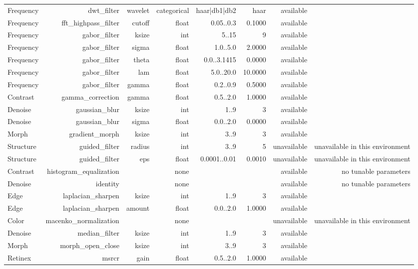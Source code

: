 \begin{tabular}{lrrrrrrr}
Frequency & dwt\_filter & wavelet & categorical & haar|db1|db2 & haar & available &  \\
Frequency & fft\_highpass\_filter & cutoff & float & 0.05..0.3 & 0.1000 & available &  \\
Frequency & gabor\_filter & ksize & int & 5..15 & 9 & available &  \\
Frequency & gabor\_filter & sigma & float & 1.0..5.0 & 2.0000 & available &  \\
Frequency & gabor\_filter & theta & float & 0.0..3.1415 & 0.0000 & available &  \\
Frequency & gabor\_filter & lam & float & 5.0..20.0 & 10.0000 & available &  \\
Frequency & gabor\_filter & gamma & float & 0.2..0.9 & 0.5000 & available &  \\
Contrast & gamma\_correction & gamma & float & 0.5..2.0 & 1.0000 & available &  \\
Denoise & gaussian\_blur & ksize & int & 1..9 & 3 & available &  \\
Denoise & gaussian\_blur & sigma & float & 0.0..2.0 & 0.0000 & available &  \\
Morph & gradient\_morph & ksize & int & 3..9 & 3 & available &  \\
Structure & guided\_filter & radius & int & 3..9 & 5 & unavailable & unavailable in this environment \\
Structure & guided\_filter & eps & float & 0.0001..0.01 & 0.0010 & unavailable & unavailable in this environment \\
Contrast & histogram\_equalization &  & none &  &  & available & no tunable parameters \\
Denoise & identity &  & none &  &  & available & no tunable parameters \\
Edge & laplacian\_sharpen & ksize & int & 1..9 & 3 & available &  \\
Edge & laplacian\_sharpen & amount & float & 0.0..2.0 & 1.0000 & available &  \\
Color & macenko\_normalization &  & none &  &  & unavailable & unavailable in this environment \\
Denoise & median\_filter & ksize & int & 1..9 & 3 & available &  \\
Morph & morph\_open\_close & ksize & int & 3..9 & 3 & available &  \\
Retinex & msrcr & gain & float & 0.5..2.0 & 1.0000 & available &  \\
\hline
\end{tabular}
